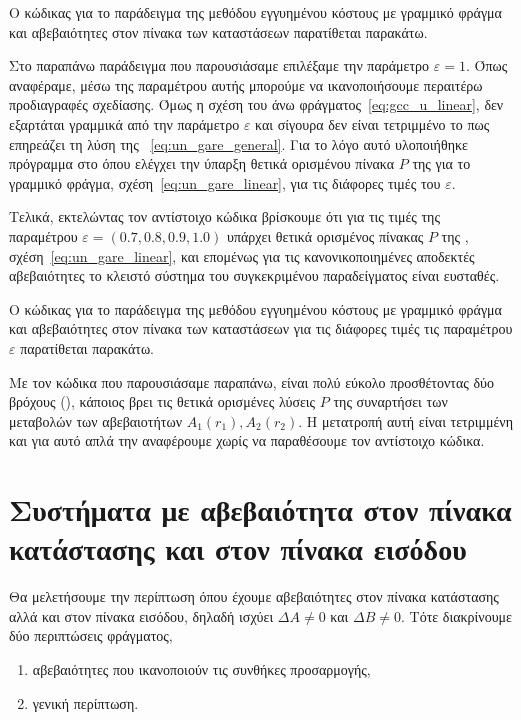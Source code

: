 Ο κώδικας για το παράδειγμα της μεθόδου εγγυημένου κόστους με γραμμικό φράγμα
και αβεβαιότητες στον πίνακα των καταστάσεων παρατίθεται παρακάτω.
\eng{}

Στο παραπάνω παράδειγμα που παρουσιάσαμε επιλέξαμε την παράμετρο
\( \varepsilon = 1 \).  Όπως αναφέραμε, μέσω της παραμέτρου αυτής
μπορούμε να ικανοποιήσουμε περαιτέρω προδιαγραφές σχεδίασης. Όμως η σχέση του άνω
φράγματος~\eqref{eq:gcc_u_linear}, δεν εξαρτάται γραμμικά από την παράμετρο \(
\varepsilon \) και σίγουρα δεν είναι τετριμμένο το πως επηρεάζει τη λύση της
~\eqref{eq:un_gare_general}. Για το λόγο αυτό υλοποιήθηκε πρόγραμμα στο
 όπου ελέγχει την ύπαρξη θετικά ορισμένου πίνακα \( P \) της
 για το γραμμικό φράγμα, σχέση~\eqref{eq:un_gare_linear},
για τις διάφορες τιμές του \( \varepsilon \).

Τελικά, εκτελώντας τον αντίστοιχο κώδικα βρίσκουμε ότι για τις τιμές της παραμέτρου
\( \varepsilon = (0.7, 0.8, 0.9, 1.0) \) υπάρχει θετικά ορισμένος πίνακας \( P
\) της , σχέση~\eqref{eq:un_gare_linear}, και επομένως για τις
κανονικοποιημένες αποδεκτές αβεβαιότητες το κλειστό σύστημα του συγκεκριμένου
παραδείγματος είναι ευσταθές.

Ο κώδικας για το παράδειγμα της μεθόδου εγγυημένου κόστους με γραμμικό φράγμα
και αβεβαιότητες στον πίνακα των καταστάσεων για τις διάφορες τιμές τις
παραμέτρου \( \varepsilon \) παρατίθεται παρακάτω.
\eng{}

Με τον κώδικα που παρουσιάσαμε παραπάνω, είναι πολύ εύκολο προσθέτοντας δύο
βρόχους (), κάποιος βρει τις θετικά ορισμένες λύσεις \( P \) της
 συναρτήσει των μεταβολών των αβεβαιοτήτων \( A_1(r_1), A_2(r_2) \).
Η μετατροπή αυτή είναι τετριμμένη και για αυτό απλά την αναφέρουμε χωρίς να
παραθέσουμε τον αντίστοιχο κώδικα.

\section{Συστήματα με αβεβαιότητα στον πίνακα κατάστασης και στον πίνακα εισόδου}
Θα μελετήσουμε την περίπτωση όπου έχουμε αβεβαιότητες στον πίνακα κατάστασης
αλλά και στον πίνακα εισόδου, δηλαδή ισχύει \( \Delta A \neq 0 \) και \( \Delta
B \neq 0 \). Τότε διακρίνουμε δύο περιπτώσεις φράγματος,
\begin{enumerate}[label = (\enumgreek*)]
    \item αβεβαιότητες που ικανοποιούν τις συνθήκες προσαρμογής,
    \item γενική περίπτωση.
\end{enumerate}

